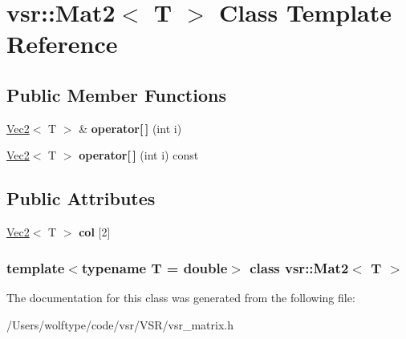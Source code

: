 \hypertarget{classvsr_1_1_mat2}{\section{vsr\-:\-:Mat2$<$ T $>$ Class Template Reference}
\label{classvsr_1_1_mat2}
}
\subsection*{Public Member Functions}
\begin{DoxyCompactItemize}
\item 
\hypertarget{classvsr_1_1_mat2_a3ab9c70adfece18af07af6cc5fbf5d77}{\hyperlink{classvsr_1_1_vec2}{Vec2}$<$ T $>$ \& {\bfseries operator\mbox{[}$\,$\mbox{]}} (int i)}\label{classvsr_1_1_mat2_a3ab9c70adfece18af07af6cc5fbf5d77}

\item 
\hypertarget{classvsr_1_1_mat2_ae6577d225cd26b2ff13f4c4147d151ed}{\hyperlink{classvsr_1_1_vec2}{Vec2}$<$ T $>$ {\bfseries operator\mbox{[}$\,$\mbox{]}} (int i) const }\label{classvsr_1_1_mat2_ae6577d225cd26b2ff13f4c4147d151ed}

\end{DoxyCompactItemize}
\subsection*{Public Attributes}
\begin{DoxyCompactItemize}
\item 
\hypertarget{classvsr_1_1_mat2_a8dfea0fcc755d550a2fa8f6af9128d17}{\hyperlink{classvsr_1_1_vec2}{Vec2}$<$ T $>$ {\bfseries col} \mbox{[}2\mbox{]}}\label{classvsr_1_1_mat2_a8dfea0fcc755d550a2fa8f6af9128d17}

\end{DoxyCompactItemize}
\subsubsection*{template$<$typename T = double$>$ class vsr\-::\-Mat2$<$ T $>$}



The documentation for this class was generated from the following file\-:\begin{DoxyCompactItemize}
\item 
/\-Users/wolftype/code/vsr/\-V\-S\-R/vsr\-\_\-matrix.\-h\end{DoxyCompactItemize}
